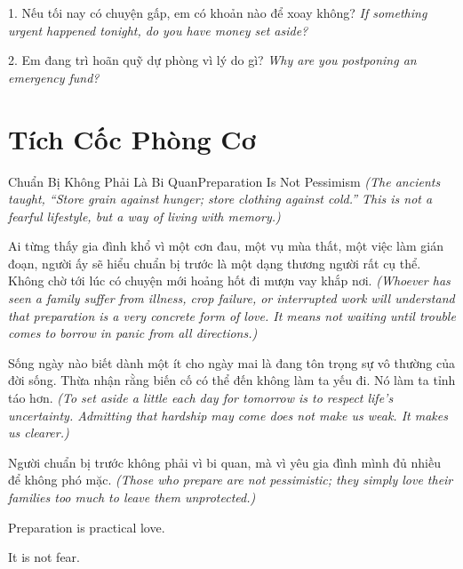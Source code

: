 \begin{tuhocnhanh}
1. Nếu tối nay có chuyện gấp, em có khoản nào để xoay không? \textit{If something urgent happened tonight, do you have money set aside?}

2. Em đang trì hoãn quỹ dự phòng vì lý do gì? \textit{Why are you postponing an emergency fund?}
\end{tuhocnhanh}
\ngancach

\section{Tích Cốc Phòng Cơ}
\begin{truyen}{Chuẩn Bị Không Phải Là Bi Quan}{Preparation Is Not Pessimism}
\textit{(The ancients taught, ``Store grain against hunger; store clothing against cold.'' This is not a fearful lifestyle, but a way of living with memory.)}

Ai từng thấy gia đình khổ vì một cơn đau, một vụ mùa thất, một việc làm gián đoạn, người ấy sẽ hiểu chuẩn bị trước là một dạng thương người rất cụ thể. Không chờ tới lúc có chuyện mới hoảng hốt đi mượn vay khắp nơi.
\textit{(Whoever has seen a family suffer from illness, crop failure, or interrupted work will understand that preparation is a very concrete form of love. It means not waiting until trouble comes to borrow in panic from all directions.)}

Sống ngày nào biết dành một ít cho ngày mai là đang tôn trọng sự vô thường của đời sống. Thừa nhận rằng biến cố có thể đến không làm ta yếu đi. Nó làm ta tỉnh táo hơn.
\textit{(To set aside a little each day for tomorrow is to respect life’s uncertainty. Admitting that hardship may come does not make us weak. It makes us clearer.)}
\end{truyen}

\begin{baihoc}
Người chuẩn bị trước không phải vì bi quan, mà vì yêu gia đình mình đủ nhiều để không phó mặc.
\textit{(Those who prepare are not pessimistic; they simply love their families too much to leave them unprotected.)}
\end{baihoc}

\begin{ghinhoanh}
Preparation is practical love.

It is not fear.
\end{ghinhoanh}


